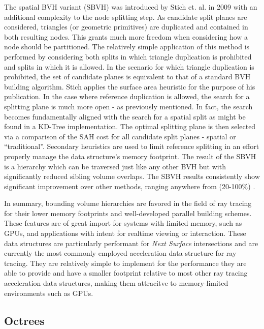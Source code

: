 The spatial BVH variant (SBVH) was introduced by Stich et. al. in 2009
\cite{Stich_2009} with an additional complexity to the node splitting step. As
candidate split planes are considered, triangles (or
geometric primitives) are duplicated and contained in both resulting nodes. This grants much
more freedom when considering how a node should be partitioned. The relatively simple application of this
method is performed by considering both splits in which triangle duplication is
prohibited and splits in which it is allowed. In the scenario for which triangle
duplication is prohibited, the set of candidate planes is equivalent to that of
a standard BVH building algorithm. Stich applies the surface area heuristic for
the purpose of his publication. In the case where reference duplication is
allowed, the search for a splitting plane is much more open - as previously
mentioned. In fact, the search becomes fundamentally aligned with the search for
a spatial split as might be found in a KD-Tree implementation. The optimal
splitting plane is then selected via a comparison of the SAH cost for all
candidate split planes - spatial or ``traditional''. Secondary heuristics are used
to limit reference splitting in an effort properly manage the data structure's
memory footprint. The result of the SBVH is a hierarchy which can be traversed
just like any other BVH but with significantly reduced sibling volume
overlaps. The SBVH results consistently show significant improvement over other
methods, ranging anywhere from (20-100\%) \cite{Stich_2009}.

In summary, bounding volume hierarchies are favored in the field of ray tracing
for their lower memory footprints and well-developed parallel building
schemes. These features are of great import for systems with limited memory,
such as GPUs, and applications with intent for realtime viewing or
interaction. These data structures are particularly performant for \textit{Next
  Surface} intersections and are currently the most commonly employed
acceleration data structure for ray tracing. They are relatively simple to
implement for the performance they are able to provide and have a smaller
footprint relative to most other ray tracing acceleration data structures,
making them attracitve to memory-limited environments such as GPUs.

\subsection{Octrees}%
\label{subsec:octree}

